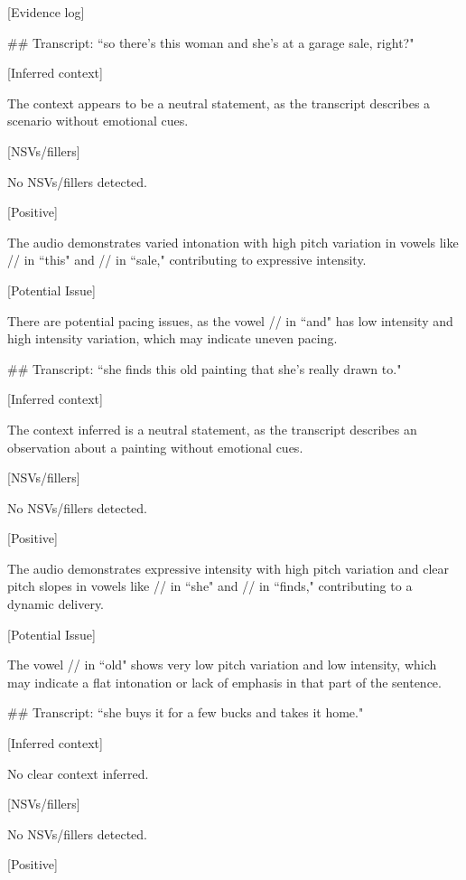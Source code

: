\begin{tcolorbox}[blue_box, title = {{Audio Sample 3 : Ground-truth Human-likeness Rating = 4.0}}]\footnotesize
[Evidence log]

\#\# Transcript: ``so there's this woman and she's at a garage sale, right?"

[Inferred context]  

The context appears to be a neutral statement, as the transcript describes a scenario without emotional cues.


[NSVs/fillers]  

No NSVs/fillers detected.


[Positive]  

The audio demonstrates varied intonation with high pitch variation in vowels like // in ``this" and // in ``sale," contributing to expressive intensity.


[Potential Issue]  

There are potential pacing issues, as the vowel // in ``and" has low intensity and high intensity variation, which may indicate uneven pacing.


\#\# Transcript: ``she finds this old painting that she's really drawn to."

[Inferred context]  

The context inferred is a neutral statement, as the transcript describes an observation about a painting without emotional cues.


[NSVs/fillers]  

No NSVs/fillers detected.


[Positive]  

The audio demonstrates expressive intensity with high pitch variation and clear pitch slopes in vowels like // in ``she" and // in ``finds," contributing to a dynamic delivery.


[Potential Issue]  

The vowel // in ``old" shows very low pitch variation and low intensity, which may indicate a flat intonation or lack of emphasis in that part of the sentence.


\#\# Transcript: ``she buys it for a few bucks and takes it home."

[Inferred context]  

No clear context inferred.


[NSVs/fillers]  

No NSVs/fillers detected.


[Positive]  


\end{tcolorbox}
